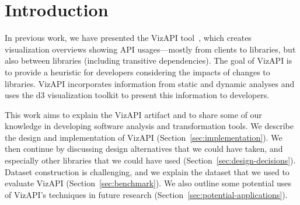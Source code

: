 \section{Introduction}
\label{sec:introduction}

In previous work, we have presented the VizAPI tool~\cite{venkatanarayanan22:_vizap,venkatanarayanan22:_study_lever_api_usage_patter}, which creates visualization overviews showing API usages---mostly from clients to libraries, but also between libraries (including transitive dependencies). The goal of VizAPI is to provide a heuristic for developers considering the impacts of changes to libraries. VizAPI incorporates information from static and dynamic analyses and uses the d3 visualization toolkit to present this information to developers. 

This work aims to explain the VizAPI artifact and to share some of our knowledge in developing software analysis and transformation tools. We describe the design and implementation of VizAPI (Section~\ref{sec:implementation}). We then continue by discussing design alternatives that we could have taken, and especially other libraries that we could have used (Section~\ref{sec:design-decisions}). Dataset construction is challenging, and we explain the dataset that we used to evaluate VizAPI (Section~\ref{sec:benchmark}). We also outline some potential uses of VizAPI's techniques in future research (Section~\ref{sec:potential-applications}).




